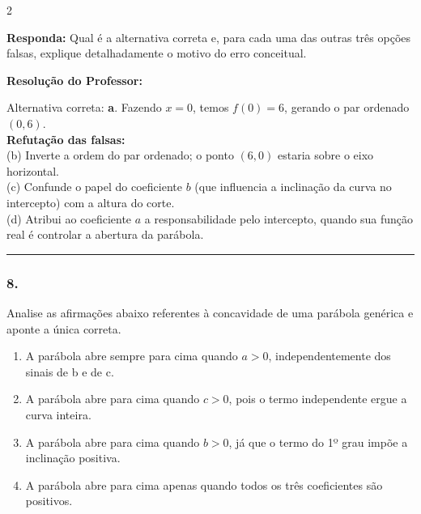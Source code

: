 \begin{multicols*}{2}
\begin{boxresponda}
\textbf{Responda:} Qual é a alternativa correta e, para cada uma das outras três opções falsas, explique detalhadamente o motivo do erro conceitual.
\end{boxresponda}

\ifgabarito
    \begin{tcolorbox}[colback=CorTitUm!5, colframe=CorTitUm, boxrule=1pt, arc=4pt, left=6pt, right=6pt, top=6pt, bottom=6pt]
    \small\textbf{\textcolor{CorTitUm}{Resolução do Professor:}}\par\vspace{0.1cm}
    \color{CinzaEscuro}
    Alternativa correta: \textbf{a}. Fazendo $x=0$, temos $f(0) = 6$, gerando o par ordenado $(0,6)$. \\
    \textbf{Refutação das falsas:} \\
    (b) Inverte a ordem do par ordenado; o ponto $(6,0)$ estaria sobre o eixo horizontal. \\
    (c) Confunde o papel do coeficiente $b$ (que influencia a inclinação da curva no intercepto) com a altura do corte. \\
    (d) Atribui ao coeficiente $a$ a responsabilidade pelo intercepto, quando sua função real é controlar a abertura da parábola.
    \end{tcolorbox}
\fi

\par\vspace{\espacoQuestao}

\noindent\textcolor{CorLinha}{\rule{\linewidth}{0.5pt}} 
\par\vspace{\espacoPreQuestao}
\subsubsection*{8.} Analise as afirmações abaixo referentes à concavidade de uma parábola genérica e aponte a única correta.

\begin{enumerate}[label=\alph*), itemsep=\espacoAlt]
\item A parábola abre sempre para cima quando $a > 0$, independentemente dos sinais de b e de c.
\item A parábola abre para cima quando $c > 0$, pois o termo independente ergue a curva inteira.
\item A parábola abre para cima quando $b > 0$, já que o termo do 1º grau impõe a inclinação positiva.
\item A parábola abre para cima apenas quando todos os três coeficientes são positivos.
\end{enumerate}


\end{multicols*}
